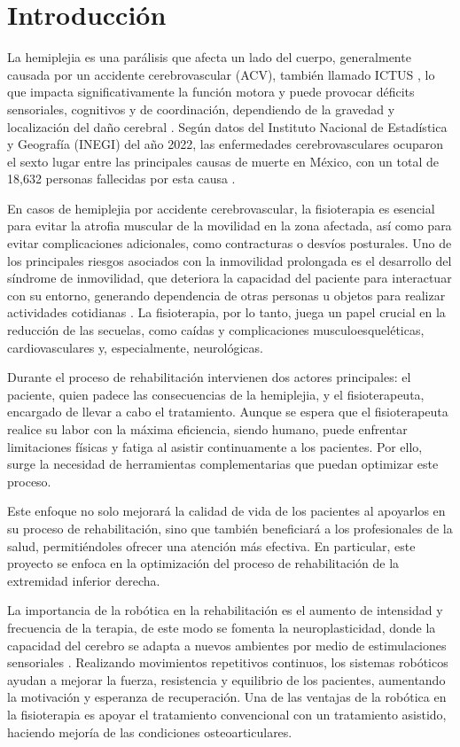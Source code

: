 \chapter{Introducción}
La hemiplejia es una parálisis que afecta un lado del cuerpo, generalmente causada por un accidente cerebrovascular (ACV), también llamado ICTUS , lo que impacta significativamente la función motora y puede provocar déficits sensoriales, cognitivos y de coordinación, dependiendo de la gravedad y localización del daño cerebral \cite{01}. Según datos del Instituto Nacional de Estadística y Geografía (INEGI) del año 2022, las enfermedades cerebrovasculares ocuparon el sexto lugar entre las principales causas de muerte en México, con un total de 18,632 personas fallecidas por esta causa \cite{02}.

En casos de hemiplejia por accidente cerebrovascular, la fisioterapia es esencial para evitar la atrofia muscular de la movilidad en la zona afectada, así como para evitar complicaciones adicionales, como contracturas o desvíos posturales. Uno de los principales riesgos asociados con la inmovilidad prolongada es el desarrollo del síndrome de inmovilidad, que deteriora la capacidad del paciente para interactuar con su entorno, generando dependencia de otras personas u objetos para realizar actividades cotidianas \cite{03}. La fisioterapia, por lo tanto, juega un papel crucial en la reducción de las secuelas, como caídas y complicaciones musculoesqueléticas, cardiovasculares y, especialmente, neurológicas.

Durante el proceso de rehabilitación intervienen dos actores principales: el paciente, quien padece las consecuencias de la hemiplejia, y el fisioterapeuta, encargado de llevar a cabo el tratamiento. Aunque se espera que el fisioterapeuta realice su labor con la máxima eficiencia, siendo humano, puede enfrentar limitaciones físicas y fatiga al asistir continuamente a los pacientes. Por ello, surge la necesidad de herramientas complementarias que puedan optimizar este proceso.

Este enfoque no solo mejorará la calidad de vida de los pacientes al apoyarlos en su proceso de rehabilitación, sino que también beneficiará a los profesionales de la salud, permitiéndoles ofrecer una atención más efectiva. En particular, este proyecto se enfoca en la optimización del proceso de rehabilitación de la extremidad inferior derecha.

La importancia de la robótica en la rehabilitación es el aumento de intensidad y frecuencia de la terapia, de este modo se fomenta la neuroplasticidad, donde la capacidad del cerebro se adapta a nuevos ambientes por medio de estimulaciones sensoriales \cite{03_01}. Realizando movimientos repetitivos continuos, los sistemas robóticos ayudan a mejorar la fuerza, resistencia y equilibrio de los pacientes, aumentando la motivación y esperanza de recuperación. Una de las ventajas de la robótica en la fisioterapia es apoyar el tratamiento convencional con un tratamiento asistido, haciendo mejoría de las condiciones osteoarticulares.

